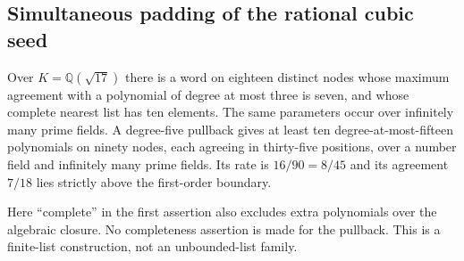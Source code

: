 \subsection{Simultaneous padding of the rational cubic seed}\label{subsec:simultaneous-padding}

\begin{theorem}\label{thm:ten-cubic-padding}
Over $K=\mathbb Q(\sqrt{17})$ there is a word on eighteen distinct nodes whose maximum agreement with a polynomial of degree at most three is seven, and whose complete nearest list has ten elements. The same parameters occur over infinitely many prime fields. A degree-five pullback gives at least ten degree-at-most-fifteen polynomials on ninety nodes, each agreeing in thirty-five positions, over a number field and infinitely many prime fields. Its rate is $16/90=8/45$ and its agreement $7/18$ lies strictly above the first-order boundary.
\end{theorem}
Here ``complete'' in the first assertion also excludes extra polynomials over the algebraic closure. No completeness assertion is made for the pullback. This is a finite-list construction, not an unbounded-list family.

